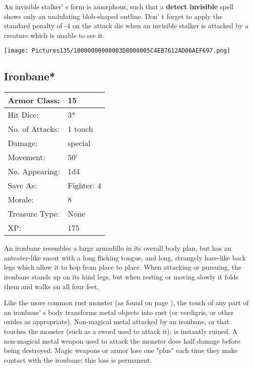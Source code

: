 \documentclass[a4paper,twoside,openany,10pt]{book}
\begin{document}
\begin{multicols}{2}
An invisible stalker' s form is amorphous, such that a \textbf{detect invisible} spell shows only an undulating blob-shaped outline. Don' t forget to apply the standard penalty of -4 on the attack die when an invisible stalker is attacked by a creature which is unable to see it.


\begin{center}
	\texttt{[image: Pictures135/10000000000003D8000005C4EB7612AD06AEF697.png]}
\end{center}

\subsection*{Ironbane*}\label{ironbane}

\begin{tabularx}{0.50\textwidth}{@{}lX@{}}
Armor Class: & 15 \\\hline
Hit Dice: & 3* \\\hline
No. of Attacks: & 1 touch \\\hline
Damage: & special \\\hline
Movement: & 50' \\\hline
No. Appearing: & 1d4 \\\hline
Save As: & Fighter: 4 \\\hline
Morale: & 8 \\\hline
Treasure Type: & None \\\hline
XP: & 175 \\\hline
\end{tabularx}\medskip

An ironbane resembles a large armadillo in its overall body plan, but has an anteater-like snout with a long flicking tongue, and long, strangely hare-like back legs which allow it to hop from place to place. When attacking or pursuing, the ironbane stands up on its hind legs, but when resting or moving slowly it folds them and walks on all four feet.

Like the more common rust monster (as found on page \hyperlink{rust-monster}{\pageref{rust-monster}}), the touch of any part of an ironbane' s body transforms metal objects into rust (or verdigris, or other oxides as appropriate). Non-magical metal attacked by an ironbane, or that touches the monster (such as a sword used to attack it), is instantly ruined. A non-magical metal weapon used to attack the monster does half damage before being destroyed. Magic weapons or armor lose one "plus" each time they make contact with the ironbane; this loss is permanent.


\end{multicols}
\end{document}
